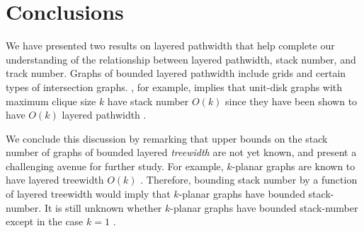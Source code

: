 \documentclass{patmorin}
\begin{document}
\section{Conclusions}

We have presented two results on layered pathwidth that help complete our understanding of the relationship between layered pathwidth, stack number, and track number.  Graphs of bounded layered pathwidth include grids and certain types of intersection graphs.  , for example, implies that unit-disk graphs with maximum clique size $k$ have stack number $O(k)$ since they have been shown to have $O(k)$ layered pathwidth \cite{DBLP:conf/gd/BannisterDDEW16,bannister2018track}.


We conclude this discussion by remarking that upper bounds on the stack number of graphs of bounded layered \emph{treewidth} are not yet known, and present a challenging avenue for further study.  For example, $k$-planar graphs are known to have layered treewidth $O(k)$ \cite[Theorem~3.1]{DBLP:journals/siamdm/DujmovicEW17}.  Therefore, bounding stack number by a function of layered treewidth would imply that $k$-planar graphs have bounded stack-number. It is still unknown whether $k$-planar graphs have bounded stack-number except in the case $k=1$ \cite{DBLP:journals/algorithmica/BekosBKR17,DBLP:journals/corr/AlamBK15}.




\end{document}
